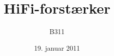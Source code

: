 

\title{HiFi-forstærker}
\author{B311}
\date{19. januar 2011}


\frame{\titlepage}
















